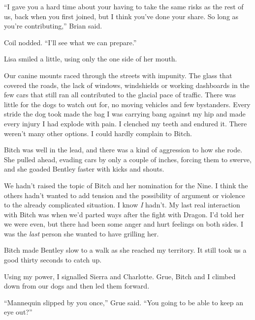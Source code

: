 ``I gave you a hard time about your having to take the same risks as the rest of us, back when you first joined, but I think you've done your share.  So long as you're contributing,'' Brian said.



Coil nodded. ``I'll see what we can prepare.''



Lisa smiled a little, using only the one side of her mouth.



\blacksquare



Our canine mounts raced through the streets with impunity.  The glass that covered the roads, the lack of windows, windshields or working dashboards in the few cars that still ran all contributed to the glacial pace of traffic.  There was little for the dogs to watch out for, no moving vehicles and few bystanders.  Every stride the dog took made the bag I was carrying bang against my hip and made every injury I had explode with pain.  I clenched my teeth and endured it.  There weren't many other options.  I could hardly complain to Bitch.



Bitch was well in the lead, and there was a kind of aggression to how she rode.  She pulled ahead, evading cars by only a couple of inches, forcing them to swerve, and she goaded Bentley faster with kicks and shouts.



We hadn't raised the topic of Bitch and her nomination for the Nine.  I think the others hadn't wanted to add tension and the possibility of argument or violence to the already complicated situation.  I know \emph{I} hadn't.  My last real interaction with Bitch was when we'd parted ways after the fight with Dragon.  I'd told her we were even, but there had been some anger and hurt feelings on both sides.  I was the \emph{last} person she wanted to have grilling her.



Bitch made Bentley slow to a walk as she reached my territory.  It still took us a good thirty seconds to catch up.



Using my power, I signalled Sierra and Charlotte.  Grue, Bitch and I climbed down from our dogs and then led them forward.



``Mannequin slipped by you once,'' Grue said.  ``You going to be able to keep an eye out?''



